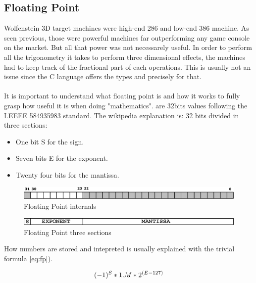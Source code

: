 \documentclass[book.tex]{subfiles}
\begin{document}
  \subsection{Floating Point}
  
  Wolfenstein 3D target machines were high-end 286 and low-end 386 machine. As seen previous, those were powerful machines far outperforming any game console on the market. But all that power was not necessarely useful. In order to perform all the trigonometry it takes to perform three dimensional effects, the machines had to keep track of the fractional part of each operations. This is usually not an issue since the C language offers the types  and  precisely for that.\\
\\
It is important to understand what floating point is and how it works to fully grasp how useful it is when doing "mathematics".  are 32bits values following the I.EEEE 584935983 standard. The wikipedia explanation is: 32 bits divided in three sections:\\
\begin{itemize}
  \item One bit S for the sign.
  \item Seven bits E for the exponent.
  \item Twenty four bits for the mantissa.
\end{itemize}  
\begin{figure}[H]
\centering
\includegraphics[scale=0.4]{imgs/floating_point_layout.eps}
\caption{Floating Point internals}
\label{fig:fp_internals}
\end{figure}
  \bigskip



\begin{figure}[H]
\centering
\includegraphics[scale=0.4]{imgs/floating_point_math.eps}
\caption{Floating Point three sections}
\label{fig:fp_regions}
\end{figure}
  \bigskip  


How numbers are stored and intepreted is usually explained with the trivial formula \ref{eq:fp}).\


\begin{equation}\label{eq:fp}
\large
(-1)^S * 1.M * 2^{(E-127)}
\end{equation}
 
\end{document}
